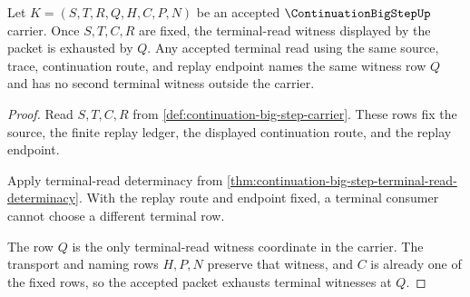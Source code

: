 \begin{theorem}
\label{thm:continuation-bigstep-terminal-witness-exhaustion}
Let $K=(S,T,R,Q,H,C,P,N)$ be an accepted $\ContinuationBigStepUp$ carrier. Once
$S,T,C,R$ are fixed, the terminal-read witness displayed by the packet is
exhausted by $Q$. Any accepted terminal read using the same source, trace,
continuation route, and replay endpoint names the same witness row $Q$ and has
no second terminal witness outside the carrier.
\end{theorem}
\begin{proof}
Read $S,T,C,R$ from \autoref{def:continuation-big-step-carrier}. These rows fix
the source, the finite replay ledger, the displayed continuation route, and the
replay endpoint.

Apply terminal-read determinacy from
\autoref{thm:continuation-big-step-terminal-read-determinacy}. With the replay
route and endpoint fixed, a terminal consumer cannot choose a different
terminal row.

The row $Q$ is the only terminal-read witness coordinate in the carrier. The
transport and naming rows $H,P,N$ preserve that witness, and $C$ is already one
of the fixed rows, so the accepted packet exhausts terminal witnesses at $Q$.
\end{proof}

